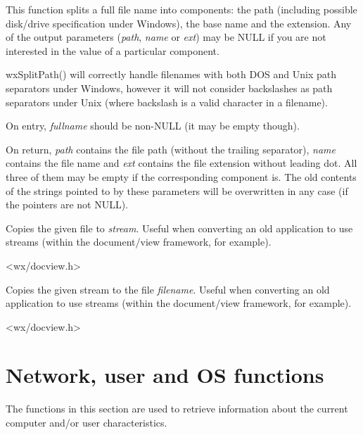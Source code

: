This function splits a full file name into components: the path (including possible disk/drive
specification under Windows), the base name and the extension. Any of the output parameters
({\it path}, {\it name} or {\it ext}) may be NULL if you are not interested in the value of
a particular component.

wxSplitPath() will correctly handle filenames with both DOS and Unix path separators under
Windows, however it will not consider backslashes as path separators under Unix (where backslash
is a valid character in a filename).

On entry, {\it fullname} should be non-NULL (it may be empty though).

On return, {\it path} contains the file path (without the trailing separator), {\it name}
contains the file name and {\it ext} contains the file extension without leading dot. All
three of them may be empty if the corresponding component is. The old contents of the
strings pointed to by these parameters will be overwritten in any case (if the pointers
are not NULL).


\label{wxtransferfiletostream}


Copies the given file to {\it stream}. Useful when converting an old application to
use streams (within the document/view framework, for example).


<wx/docview.h>


\label{wxtransferstreamtofile}


Copies the given stream to the file {\it filename}. Useful when converting an old application to
use streams (within the document/view framework, for example).


<wx/docview.h>



\section{Network, user and OS functions}\label{networkfunctions}

The functions in this section are used to retrieve information about the
current computer and/or user characteristics.


